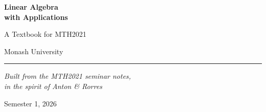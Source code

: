 \documentclass[11pt,oneside]{book}
\begin{document}
\begin{titlepage}
\centering
\vspace*{2.2cm}
{\Huge\bfseries\color{NavyBlue} Linear Algebra\\[4pt] with Applications\par}
\vspace{1.0cm}
{\large A Textbook for MTH2021\par}
\vspace{0.3cm}
{\normalsize Monash University\par}
\vspace{2.4cm}
\rule{0.6\textwidth}{0.8pt}\par
\vspace{0.8cm}
{\large\itshape Built from the MTH2021 seminar notes,\\ in the spirit of Anton \& Rorres\par}
\vfill
{\small Semester 1, 2026\par}
\end{titlepage}

\tableofcontents
\cleardoublepage

\setcounter{chapter}{0}







\end{document}
